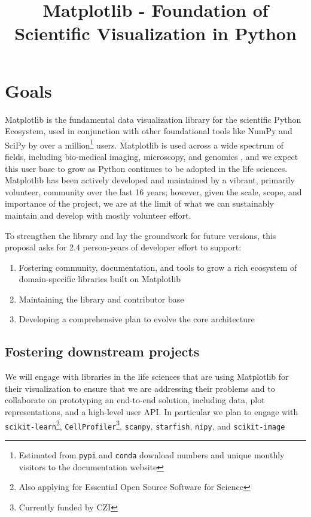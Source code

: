 \documentclass[11pt,letterpaper]{article}  %
\begin{document}
\title{Matplotlib - Foundation of Scientific Visualization in Python}
\author{}
\maketitle

\section{Goals}

Matplotlib\cite{Hunter:2007} is the fundamental
data visualization library for the scientific Python Ecosystem, used
in conjunction with other foundational tools like NumPy and
SciPy \cite{Jones2001} by over a million\footnote{Estimated from \texttt{pypi}
and \texttt{conda} download numbers and unique monthly visitors to the documentation website} users.
Matplotlib is used across a wide spectrum of fields, including bio-medical imaging,
microscopy, and genomics \cite{Carpenter2006,Wolf2018,10.7717/peerj.453,
  Segata2011,10.1371/journal.pgen.1000695,HASHIMSHONY2012666,
  10.1093/bioinformatics/bts480,Carlile2014,Laganowsky2014,Jiangaac9462,
  10.3389/fninf.2014.00014}, and we expect this user base to grow as Python
  continues to be adopted in the life sciences. %
Matplotlib has been actively developed and maintained by a vibrant,
primarily volunteer, community over the last 16 years; however, given
the scale, scope, and importance of the project, we are at the limit
of what we can sustainably maintain and develop with mostly
volunteer effort.

To strengthen the library and lay the groundwork for future versions, this proposal asks for 2.4 person-years of developer effort to support:


\begin{enumerate}[label=\alph*),noitemsep]
  \item Fostering community, documentation, and tools to grow a rich ecosystem of domain-specific libraries built on Matplotlib
  \item Maintaining the library and contributor base
  \item Developing a comprehensive plan to evolve the core architecture
\end{enumerate}

\subsection{Fostering downstream projects}
\label{sec:downstream}
We will engage with libraries in the life sciences that are using Matplotlib for their visualization to ensure that we are addressing their problems and to collaborate on prototyping an end-to-end solution, including data, plot representations, and a high-level user API.
In particular we plan to engage with \texttt{scikit-learn}\footnote{Also applying for Essential Open Source
Software for Science}, \texttt{CellProfiler}\footnote{Currently funded
by CZI\label{f:czi}}, \texttt{scanpy}, \texttt{starfish}, \texttt{nipy}, and
\texttt{scikit-image} \cite{10.7717/peerj.453,Carpenter2006, Wolf2018}
\end{document}
